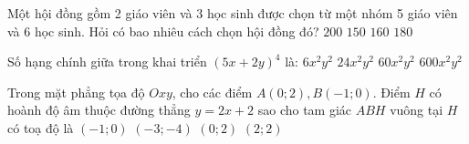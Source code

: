 \begin{ex}%
	Một hội đồng gồm 2 giáo viên và 3 học sinh được chọn từ một nhóm 5 giáo viên và 6 học sinh. Hỏi có bao nhiêu cách chọn hội đồng đó?
	\choice
	{\True$200$}
	{$150$}
	{$160$}
	{$180$}
\end{ex}
\begin{ex}%
	Số hạng chính giữa trong khai triển $(5x+2y)^4$ là:
	\choice
	{$6x^2y^2$}
	{$24x^2y^2$}
	{$60x^2y^2$}
	{\True $600x^2y^2$}
\end{ex}
\begin{ex}%
	Trong mặt phẳng tọa độ $Ox y$, cho các điểm $A(0; 2), B(-1; 0)$. Điểm $H$ có hoành độ âm thuộc đường thẳng $y=2x+2$ sao cho tam giác $ABH$ vuông tại $H$ có toạ độ là
	\choice
	{\True$(-1; 0)$}
	{$(-3;-4)$}
	{$(0; 2)$}
	{$(2; 2)$}
	\loigiai{}
\end{ex}
